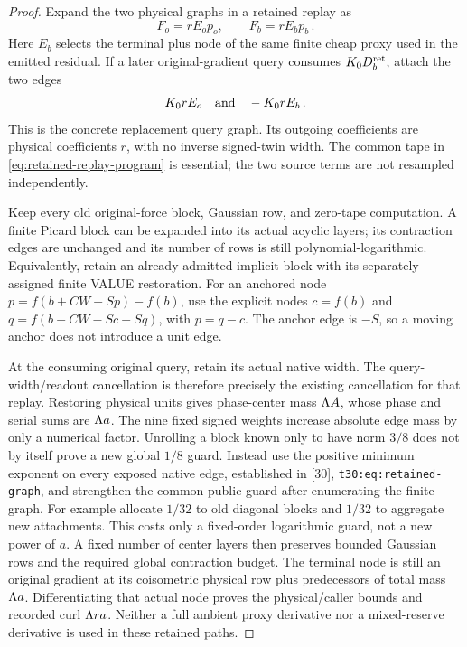 \documentclass[11pt]{article}
\numberwithin{equation}{section}
\theoremstyle{remark}\newtheorem{remark}[theorem]{Remark}
\newcommand{\src}[1]{\texttt{\nolinkurl{#1}}}
\begin{document}
\begin{proof}
Expand the two physical graphs in a retained replay as
\[
 F_o=rE_op_o,\qquad F_b=rE_bp_b\,.
\]
Here $E_b$ selects the terminal plus node of the same finite cheap
proxy used in the emitted residual. If a later original-gradient
query consumes $K_0D_b^{\rm ret}$, attach the two edges
\begin{equation}\label{eq:replay-edges}
 K_0rE_o\quad\hbox{and}\quad -K_0rE_b\,.
\end{equation}
This is the concrete replacement query graph. Its outgoing coefficients
are physical coefficients $r$, with no inverse signed-twin width.
The common tape in \eqref{eq:retained-replay-program} is essential;
the two source terms are not resampled independently.

Keep every old original-force block, Gaussian row, and zero-tape
computation. A finite Picard block can be expanded into its actual
acyclic layers; its contraction edges are unchanged and its number
of rows is still polynomial-logarithmic. Equivalently, retain an
already admitted implicit block with its separately assigned finite
VALUE restoration. For an anchored node
$p=f(b+CW+Sp)-f(b)$, use the explicit nodes
$c=f(b)$ and $q=f(b+CW-Sc+Sq)$, with $p=q-c$. The anchor edge
is $-S$, so a moving anchor does not introduce a unit edge.

At the consuming original query, retain its actual native width.
The query-width/readout cancellation is therefore precisely the
existing cancellation for that replay. Restoring physical units gives
phase-center mass $\Lambda A$, whose phase and serial sums are $\Lambda a$.
The nine fixed signed weights increase absolute edge mass by only
a numerical factor. Unrolling a block known only to have norm $3/8$
does not by itself prove a new global $1/8$ guard. Instead use the
positive minimum exponent on every exposed native edge, established
in [30], \src{t30:eq:retained-graph}, and strengthen the common public
guard after enumerating the finite graph. For example allocate $1/32$
to old diagonal blocks and $1/32$ to aggregate new attachments.
This costs only a fixed-order logarithmic guard, not a new power of $a$.
A fixed number of center layers then preserves bounded Gaussian rows
and the required global contraction budget. The terminal node
is still an original gradient at its coisometric physical row plus
predecessors of total mass $\Lambda a$. Differentiating that actual node
proves the physical/caller bounds and recorded curl $\Lambda ra$.
Neither a full ambient proxy derivative nor a mixed-reserve derivative
is used in these retained paths.


\end{proof}
\end{document}
